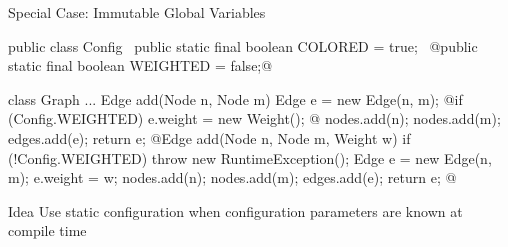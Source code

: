 \begin{frame}[fragile]{Special Case: Immutable Global Variables}
	\begin{mycolumns}[widths={56}]
		\small
\begin{codetight}{}
public class Config {
	~public static final boolean COLORED = true;~
	@public static final boolean WEIGHTED = false;@
}
\end{codetight}
\begin{codetight}{}
class Graph {
	...
	Edge add(Node n, Node m) {
		Edge e = new Edge(n, m);
		@if (Config.WEIGHTED) { e.weight = new Weight(); }@
		nodes.add(n); nodes.add(m); edges.add(e);
		return e;
	}
	@Edge add(Node n, Node m, Weight w) {
		if (!Config.WEIGHTED) { throw new RuntimeException(); }
		Edge e = new Edge(n, m);
		e.weight = w;
		nodes.add(n); nodes.add(m); edges.add(e);
		return e;
	}@
}
\end{codetight}
	\mynextcolumn
		\begin{definition}{Idea}
			Use static configuration when configuration parameters are known at compile time
		\end{definition}
	\end{mycolumns}
\end{frame}

